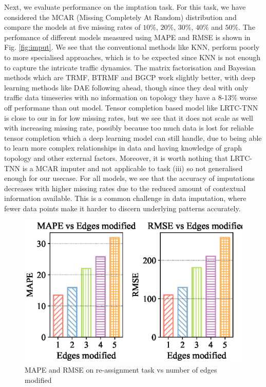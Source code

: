 Next, we evaluate performance on the imptation task. For this task, we have considered the MCAR (Missing Completely At Random) distribution and compare the models at five missing rates of $10\%$, $20\%$, $30\%$, $40\%$ and $50\%$. The perfomance of different models measured using MAPE and RMSE is shown in Fig. \ref{fig:imput}. We see that the conventional methods like KNN, perform poorly to more specialised approaches, which is to be expected since KNN is not enough to capture the intricate traffic dynamics. The matrix factorisation and Bayesian methods which are TRMF, BTRMF and BGCP work slightly better, with deep learning methods like DAE following ahead, though since they deal with only traffic data timeseries with no information on topology they have a 8-13\% worse off performane than out model. Tensor completion based model like LRTC-TNN is close to our \name in for low missing rates, but we see that it does not scale as well with increasing missing rate, possibly because too much data is lost for reliable tensor completion which a deep learning model can still handle, due to being able to learn more complex relationships in data and having knowledge of graph topology and other external factors. Moreover, it is worth nothing that LRTC-TNN is a MCAR imputer and not applicable to task (iii) so not generalised enough for our usecase. For all models, we see that the accuracy of imputations decreases with higher missing rates due to the reduced amount of contextual information available. This is a common challenge in data imputation, where fewer data points make it harder to discern underlying patterns accurately. 


\begin{figure}[t]
    \centering
    \includegraphics[width=\linewidth]{modif.eps}
    \caption{MAPE and RMSE on re-assignment task vs number of edges modified}
    \label{fig:edge_modif}
\end{figure}

